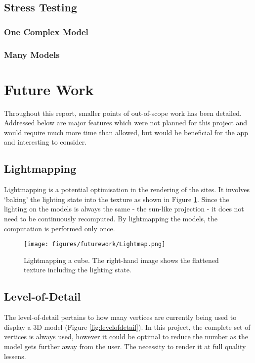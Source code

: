 \documentclass{article}
\begin{document}
\subsection{Stress Testing}

\subsubsection{One Complex Model}

\subsubsection{Many Models}

\section{Future Work}
Throughout this report, smaller points of out-of-scope work has been detailed. Addressed below are major features which were not planned for this project and would require much more time than allowed, but would be beneficial for the app and interesting to consider.

\subsection{Lightmapping}
Lightmapping is a potential optimisation in the rendering of the sites. It involves `baking' the lighting state into the texture as shown in Figure \ref{fig:lightmapping}. Since the lighting on the models is always the same - the sun-like projection - it does not need to be continuously recomputed. By lightmapping the models, the computation is performed only once.

\begin{figure}
\centering
    \texttt{[image: figures/futurework/Lightmap.png]}
        \caption{Lightmapping a cube. The right-hand image shows the flattened texture including the lighting state. \cite{futurework:lightmapping}}
        \label{fig:lightmapping}
\end{figure}

\subsection{Level-of-Detail}
The level-of-detail pertains to how many vertices are currently being used to display a 3D model (Figure \ref{fig:levelofdetail}). In this project, the complete set of vertices is always used, however it could be optimal to reduce the number as the model gets further away from the user. The necessity to render it at full quality lessens. 
\end{document}
